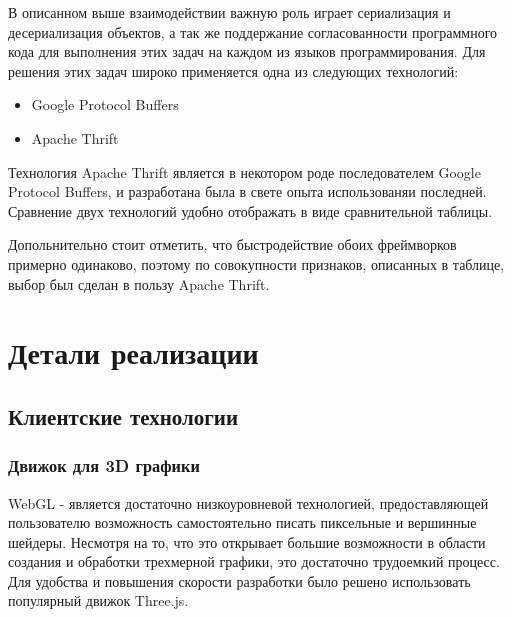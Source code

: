 \documentclass[12pt, a4paper]{article}
\let\stdsection\section
\renewcommand\section{\newpage\stdsection}
\begin{document}
В описанном выше взаимодействии важную роль играет сериализация и десериализация
объектов, а так же поддержание согласованности программного кода для выполнения
этих задач на каждом из языков программирования. Для решения этих задач широко
применяется одна из следующих технологий:
\begin{itemize}
    \item Google Protocol Buffers
    \item Apache Thrift
\end{itemize}

Технология Apache Thrift является в некотором роде последователем Google
Protocol Buffers, и разработана была в свете опыта использованяи последней. Сравнение двух технологий удобно отображать в виде сравнительной
таблицы.

\begin{center}
\end{center}

Допольнительно стоит отметить, что быстродействие обоих фреймворков примерно
одинаково, поэтому по совокупности признаков, описанных в таблице, выбор был
сделан в пользу Apache Thrift.

\section{Детали реализации}
\subsection{Клиентские технологии}
\subsubsection{Движок для 3D графики}
WebGL - является достаточно низкоуровневой технологией, предоставляющей
пользователю возможность самостоятельно писать пиксельные и вершинные шейдеры.
Несмотря на то, что это открывает большие возможности в области создания и
обработки трехмерной графики, это достаточно трудоемкий процесс. Для
удобства и повышения скорости разработки было решено использовать популярный
движок Three.js.
\end{document}
